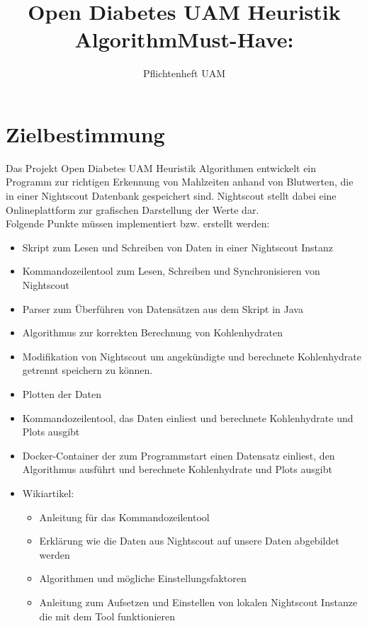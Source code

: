 \documentclass[accentcolor=tud0b,12pt,paper=a4]{tudreport}
\title{Open Diabetes UAM Heuristik Algorithm}
\subtitle{Pflichtenheft UAM}
\begin{document}
	\maketitle
	\tableofcontents 
	\newpage
	\chapter{Zielbestimmung}
	
	Das Projekt Open Diabetes UAM Heuristik Algorithmen entwickelt ein Programm zur richtigen Erkennung von Mahlzeiten anhand von Blutwerten, die in einer Nightscout Datenbank gespeichert sind. 
	Nightscout stellt dabei eine Onlineplattform zur grafischen Darstellung der Werte dar. \\

Folgende Punkte müssen implementiert bzw. erstellt werden:\\

\title{\textbf{Must-Have:}}
\begin{itemize}
	\item Skript zum Lesen und Schreiben von Daten in einer Nightscout Instanz	
	\item Kommandozeilentool zum Lesen, Schreiben und Synchronisieren von Nightscout
	\item Parser zum Überführen von Datensätzen aus dem Skript in Java
	\item Algorithmus zur korrekten Berechnung von Kohlenhydraten
	\item Modifikation von Nightscout um angekündigte und berechnete Kohlenhydrate getrennt speichern  zu können.      %
	\item Plotten der Daten 
	\item Kommandozeilentool, das Daten einliest und berechnete Kohlenhydrate und Plots ausgibt
	\item Docker-Container der zum Programmstart einen Datensatz einliest, den Algorithmus ausführt und berechnete Kohlenhydrate und Plots ausgibt

	\item Wikiartikel:
	\begin{itemize}
	\item Anleitung für das Kommandozeilentool
	\item Erklärung wie die Daten aus Nightscout auf unsere Daten abgebildet werden
	\item Algorithmen und mögliche Einstellungsfaktoren
	\item Anleitung zum Aufsetzen und Einstellen von lokalen Nightscout Instanze die mit dem Tool funktionieren
	\end{itemize}

\end{itemize}
\end{document}
